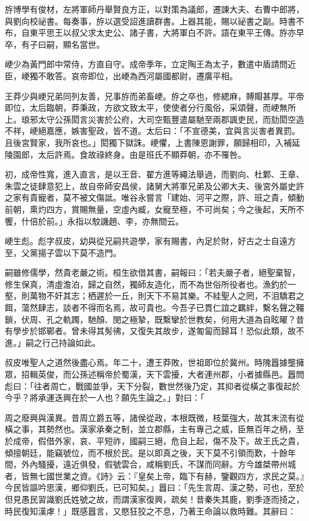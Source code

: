 \begin{pinyinscope}
斿博學有俊材，左將軍師丹舉賢良方正，以對策為議郎，遷諫大夫、右曹中郎將，與劉向校祕書。每奏事，斿以選受詔進讀群書。上器其能，賜以祕書之副。時書不布，自東平思王以叔父求太史公、諸子書，大將軍白不許。語在東平王傳。斿亦早卒，有子曰嗣，顯名當世。

峺少為黃門郎中常侍，方直自守。成帝季年，立定陶王為太子，數遣中盾請問近臣，峺獨不敢答。哀帝即位，出峺為西河屬國都尉，遷廣平相。

王莽少與峺兄弟同列友善，兄事斿而弟畜峺。斿之卒也，修緦麻，賻賵甚厚。平帝即位，太后臨朝，莽秉政，方欲文致太平，使使者分行風俗，采頌聲，而峺無所上。琅邪太守公孫閎言災害於公府，大司空甄豐遣屬馳至兩郡諷吏民，而劾閎空造不祥，峺絕嘉應，嫉害聖政，皆不道。太后曰：「不宣德美，宜與言災害者異罰。且後宮賢家，我所哀也。」閎獨下獄誅。峺懼，上書陳恩謝罪，願歸相印，入補延陵園郎，太后許焉。食故祿終身。由是班氏不顯莽朝，亦不罹咎。

初，成帝性寬，進入直言，是以王音、翟方進等繩法舉過，而劉向、杜鄴、王章、朱雲之徒肆意犯上，故自帝師安昌侯，諸舅大將軍兄弟及公卿大夫、後宮外屬史許之家有貴寵者，莫不被文傷詆。唯谷永嘗言「建始、河平之際，許、班之貴，傾動前朝，熏灼四方，賞賜無量，空虛內臧，女寵至極，不可尚矣；今之後起，天所不饗，什倍於前。」永指以駮譏趙、李，亦無間云。

峺生彪。彪字叔皮，幼與從兄嗣共遊學，家有賜書，內足於財，好古之士自遠方至，父黨揚子雲以下莫不造門。

嗣雖修儒學，然貴老嚴之術。桓生欲借其書，嗣報曰：「若夫嚴子者，絕聖棄智，修生保真，清虛澹泊，歸之自然，獨師友造化，而不為世俗所役者也。漁釣於一壑，則萬物不奸其志；栖遲於一丘，則天下不易其樂。不絓聖人之罔，不泪驕君之餌，蕩然肆志，談者不得而名焉，故可貴也。今吾子已貫仁誼之羈絆，繫名聲之韁鎖，伏周、孔之軌躅，馳顏、閔之極摯，既繫攣於世教矣，何用大道為自眩曜？昔有學步於邯鄲者。曾未得其髣彿，又復失其故步，遂匍匐而歸耳！恐似此類，故不進。」嗣之行己持論如此。

叔皮唯聖人之道然後盡心焉。年二十，遭王莽敗，世祖即位於冀州。時隗囂據壟擁眾，招輯英俊，而公孫述稱帝於蜀漢，天下雲擾，大者連州郡，小者據縣邑。囂問彪曰：「往者周亡，戰國並爭，天下分裂，數世然後乃定，其抑者從橫之事復起於今乎？將承運迭興在於一人也？願先生論之。」對曰：「

周之廢興與漢異。昔周立爵五等，諸侯從政，本根既微，枝葉強大，故其末流有從橫之事，其勢然也。漢家承秦之制，並立郡縣，主有專己之威，臣無百年之柄，至於成帝，假借外家，哀、平短祚，國嗣三絕，危自上起，傷不及下。故王氏之貴，傾擅朝廷，能竊號位，而不根於民。是以即真之後，天下莫不引領而歎，十餘年間，外內騷擾，遠近俱發，假號雲合，咸稱劉氏，不謀而同辭。方今雄桀帶州城者，皆無七國世業之資。《詩》云：『皇矣上帝，臨下有赫，鑒觀四方，求民之莫。』今民皆謳吟思漢，鄉仰劉氏，已可知矣。」囂曰：「先生言周、漢之勢，可也，至於但見愚民習識劉氏姓號之故，而謂漢家復興，疏矣！昔秦失其鹿，劉季逐而掎之，時民復知漢虖！」既感囂言，又愍狂狡之不息，乃著王命論以救時難。其辭曰：


\end{pinyinscope}
